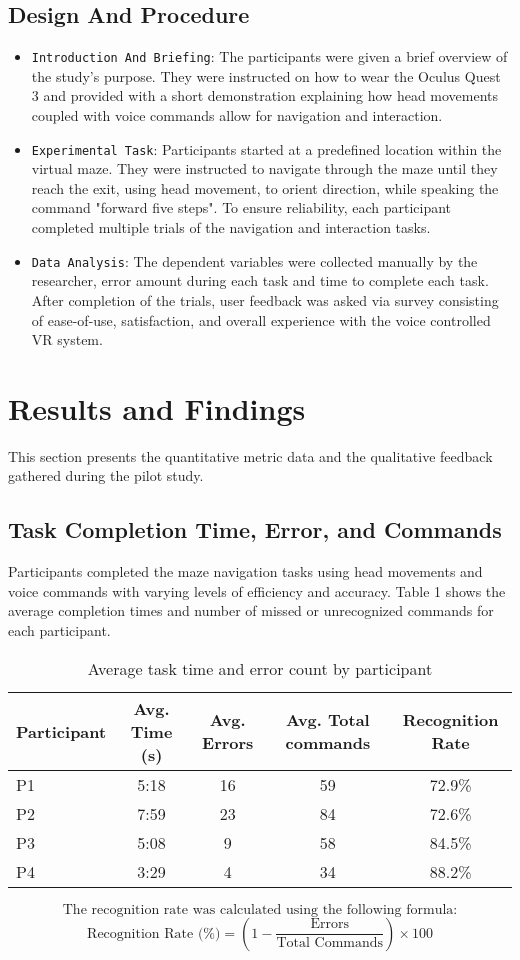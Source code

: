 \documentclass[manuscript, screen, review]{acmart}
\begin{document}
\subsection{Design And Procedure}
\begin{itemize}
\item {\texttt{Introduction And Briefing}}: The participants were given a brief overview of the study's purpose. They were instructed on how to wear the Oculus Quest 3 and provided with a short demonstration explaining how head movements coupled with voice commands allow for navigation and interaction.
\item {\texttt{Experimental Task}}: Participants started at a predefined location within the virtual maze. They were instructed to navigate through the maze until they reach the exit, using head movement, to orient direction, while speaking the command "forward five steps". To ensure reliability, each participant completed multiple trials of the navigation and interaction tasks.
\item {\texttt{Data Analysis}}: The dependent variables were collected manually by the researcher, error amount during each task and time to complete each task. After completion of the trials, user feedback was asked via survey consisting of ease-of-use, satisfaction, and overall experience with the voice controlled VR system.  
\end{itemize}

\section{Results and Findings}
This section presents the quantitative metric data and the qualitative feedback gathered during the pilot study. 
\subsection{Task Completion Time, Error, and Commands}
Participants completed the maze navigation tasks using head movements and voice commands with varying levels of efficiency and accuracy. Table 1 shows the average completion times and number of missed or unrecognized commands for each participant. 
\begin{table}[htbp]
  \caption{Average task time and error count by participant}
  \label{tab:performance}
  \begin{tabular}{lcccc}
    \toprule
    Participant & Avg. Time (s) & Avg. Errors & Avg. Total commands & Recognition Rate\\
    \midrule
    P1 & 5:18 & 16 & 59 & 72.9\%\\
    P2 & 7:59 & 23 & 84 & 72.6\%\\
    P3 & 5:08 & 9 & 58 & 84.5\%\\
    P4 & 3:29 & 4 & 34 & 88.2\%\\
    \bottomrule
  \end{tabular}
\end{table}
\[
\text{The recognition rate was calculated using the following formula:}
\]
\[
\text{Recognition Rate (\%)} = \left(1 - \frac{\text{Errors}}{\text{Total Commands}}\right) \times 100
\]
\end{document}
